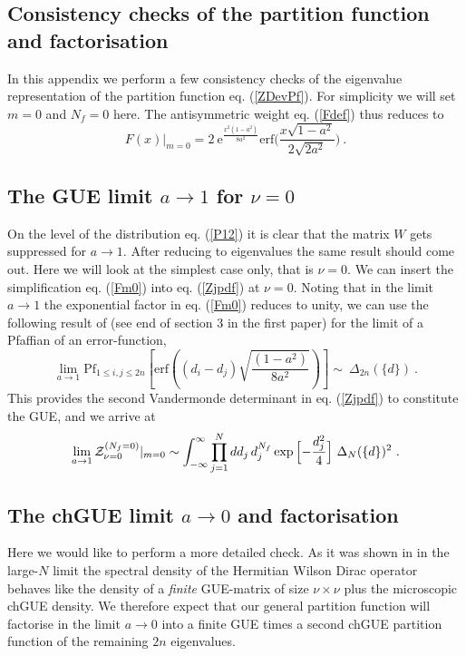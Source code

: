 \documentclass[11pt]{article}
\newcommand{\be}{\begin{equation}}
\newcommand{\ee}{\end{equation}}
\newcommand{\e}{\mbox{e}}
\newcommand{\erf}{\mbox{erf}}
\newcommand{\sect}[1]{\setcounter{equation}{0}\section{#1}}
\def\Pf{\mbox{Pf}}
\begin{document}
\begin{appendix}
\sect{Consistency checks of the partition function and
  factorisation}\label{Zjpdfgen} 

In this appendix we perform a few consistency checks of the eigenvalue
representation of the partition function eq. (\ref{ZDevPf}). For
simplicity we will set $m=0$ and $N_f=0$ here. The antisymmetric weight
eq. (\ref{Fdef}) thus reduces to 
\be
F(x)|_{m=0}=2\ \e^{\frac{x^2(1-a^2)}{8a^2}}
\erf\Big(\frac{x\sqrt{1-a^2}}{2\sqrt{2a^2}}\Big)\ .
\label{Fm0}
\ee

\subsection{The GUE limit $a\to 1$ for $\nu=0$}

On the level of
the distribution eq. (\ref{P12}) it is clear that the matrix $W$ gets
suppressed for $a\to1$. After reducing to eigenvalues the same result
should come out. 
Here we will look at the simplest case only, that is $\nu=0$.
We can insert the simplification  eq. (\ref{Fm0})
into eq. (\ref{Zjpdf}) at $\nu=0$. Noting that in
the limit $a\to1$ the exponential factor in eq. (\ref{Fm0}) reduces to unity,
we can use the following result of \cite{PandeyMehta} (see
end of section 3 in the first paper) 
for the limit of a Pfaffian of an error-function,
\be
\lim_{a\to1} \Pf_{1\leq i,j\leq 2n}\left[
\erf\left( (d_{i}-d_{j}) \sqrt{\frac{(1-a^2)}{8a^2}}\right)
\right]
\sim\ \Delta_{2n}(\{d\})\ .
\ee
This provides the second Vandermonde determinant in eq. (\ref{Zjpdf}) to
constitute the GUE, and we arrive at
\be
\lim_{a\to1}{\cal Z}_{\nu=0}^{(N_f=0)}|_{m=0} \sim
\int_{-\infty}^\infty\prod_{j=1}^{N}
dd_j\,d_j^{N_f}\exp\Big[{-\frac{d_j^2}{4}}\Big]
\ \Delta_{N}(\{d\})^2\ .
\label{ZGUE}
\ee



\subsection{The chGUE limit $a\to0$ and factorisation}

Here we would like to perform a more detailed check. As it was shown
in \cite{ADSV} 
in the large-$N$ limit
the spectral density of the Hermitian Wilson Dirac operator behaves
like the density of a 
{\it finite} GUE-matrix of size $\nu\times\nu$ plus the microscopic
chGUE density. We therefore expect
that our general partition function will factorise in the limit
$a\to0$ into a finite GUE times a second chGUE partition function of the
remaining $2n$ eigenvalues. 


\end{appendix}
\end{document}
